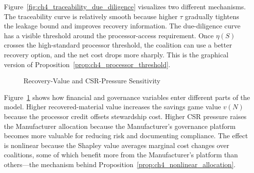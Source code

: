 Figure~\ref{fig:ch4_traceability_due_diligence} visualizes two different mechanisms. The traceability curve is relatively smooth because higher $\tau$ gradually tightens the leakage bound and improves recovery information. The due-diligence curve has a visible threshold around the processor-access requirement. Once $\eta(S)$ crosses the high-standard processor threshold, the coalition can use a better recovery option, and the net cost drops more sharply. This is the graphical version of Proposition~\ref{prop:ch4_processor_threshold}.

\begin{figure}[htbp]
\centering
{}
\hfill
{}
\caption{Recovery-Value and CSR-Pressure Sensitivity}
\label{fig:ch4_recovery_pressure}
\end{figure}

Figure~\ref{fig:ch4_recovery_pressure} shows how financial and governance variables enter different parts of the model. Higher recovered-material value increases the savings game value $v(N)$ because the processor credit offsets stewardship cost. Higher CSR pressure raises the Manufacturer allocation because the Manufacturer's governance platform becomes more valuable for reducing risk and documenting compliance. The effect is nonlinear because the Shapley value averages marginal cost changes over coalitions, some of which benefit more from the Manufacturer's platform than others---the mechanism behind Proposition~\ref{prop:ch4_nonlinear_allocation}.

